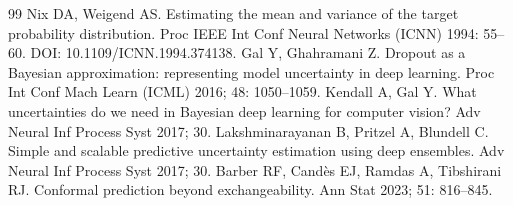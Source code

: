 \begin{thebibliography}{99}
 Nix DA, Weigend AS. Estimating the mean and variance of the target probability distribution. Proc IEEE Int Conf Neural Networks (ICNN) 1994: 55--60. DOI: 10.1109/ICNN.1994.374138.
 Gal Y, Ghahramani Z. Dropout as a Bayesian approximation: representing model uncertainty in deep learning. Proc Int Conf Mach Learn (ICML) 2016; 48: 1050--1059.
 Kendall A, Gal Y. What uncertainties do we need in Bayesian deep learning for computer vision? Adv Neural Inf Process Syst 2017; 30.
 Lakshminarayanan B, Pritzel A, Blundell C. Simple and scalable predictive uncertainty estimation using deep ensembles. Adv Neural Inf Process Syst 2017; 30.
 Barber RF, Cand\`es EJ, Ramdas A, Tibshirani RJ. Conformal prediction beyond exchangeability. Ann Stat 2023; 51: 816--845.
\end{thebibliography}


